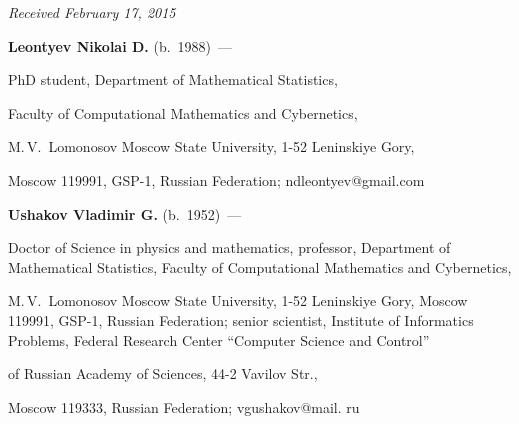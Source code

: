\vspace*{-1pt}



\hfill{\small\textit{Received February 17, 2015}}



\Contr



\noindent

\textbf{Leontyev Nikolai D.} (b.\ 1988)~---

PhD student, Department of Mathematical Statistics,

Faculty of Computational Mathematics and Cybernetics,

M.\,V.~Lomonosov Moscow State  University, 1-52 Leninskiye Gory,

Moscow 119991, GSP-1, Russian Federation; ndleontyev@gmail.com



\vspace*{3pt}



\noindent

\textbf{Ushakov Vladimir G.} (b.\ 1952)~---

 Doctor of Science in physics and mathematics, professor, Department of Mathematical Statistics, Faculty of Computational Mathematics and Cybernetics,

 M.\,V.~Lomonosov Moscow State University, 1-52 Leninskiye Gory, Moscow 119991, GSP-1, Russian Federation; senior scientist, Institute of Informatics Problems, Federal Research Center ``Computer Science and Control''

 of Russian Academy of Sciences, 44-2 Vavilov Str., 

Moscow 119333, Russian Federation; vgushakov@mail. ru



 \label{end\stat}





\renewcommand{\bibname}{\protect\rm Литература} 